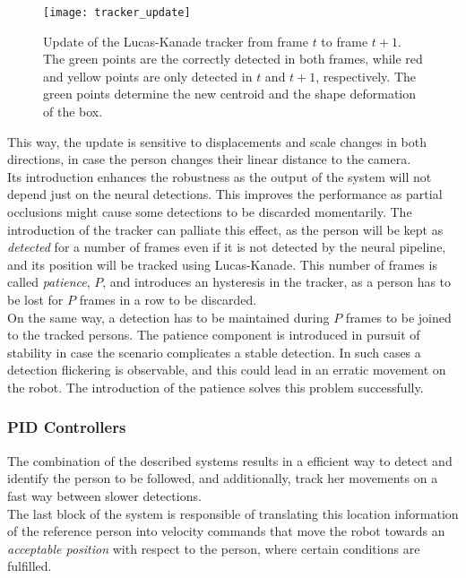\begin{figure}[h]
	\centering
	\texttt{[image: tracker\_update]}
	\caption{Update of the Lucas-Kanade tracker from frame $t$ to frame $t+1$. The green points are the correctly detected in both frames, while red and yellow points are only detected in $t$ and $t+1$, respectively. The green points determine the new centroid and the shape deformation of the box.}
	\label{fig:2_tracker_update}
\end{figure}

This way, the update is sensitive to displacements and scale changes in both directions, in case the person changes their linear distance to the camera.\\



Its introduction enhances the robustness as the output of the system will not depend just on the neural detections. This improves the performance as partial occlusions might cause some detections to be discarded momentarily. The introduction of the tracker can palliate this effect, as the person will be kept as \textit{detected} for a number of frames even if it is not detected by the neural pipeline, and its position will be tracked using Lucas-Kanade. This number of frames is called \textit{patience}, $P$, and introduces an hysteresis in the tracker, as a person has to be lost for $P$ frames in a row to be discarded.\\



On the same way, a detection has to be maintained during $P$ frames to be joined to the tracked persons. The patience component is introduced in pursuit of stability in case the scenario complicates a stable detection. In such cases a detection flickering is observable, and this could lead in an erratic movement on the robot. The introduction of the patience solves this problem successfully.


\subsubsection{PID Controllers}
The combination of the described systems results in a efficient way to detect and identify the person to be followed, and additionally, track her movements on a fast way between slower detections.\\

The last block of the system is responsible of  translating this location information of the reference person into velocity commands that move the robot towards an \textit{acceptable position} with respect to the person, where certain conditions are fulfilled.\\

